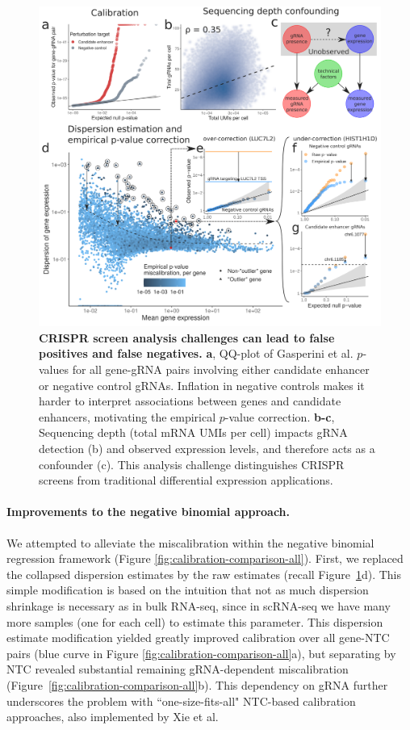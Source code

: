 \documentclass{nature}
\begin{document}
\addtocounter{page}{-1}
\thispagestyle{empty} 
\begin{figure}[h!]
	\includegraphics[width = \textwidth]{figures/Figure1/Figure1.png}
	\caption{\textbf{CRISPR screen analysis challenges can lead to false positives and false negatives.} \textbf{a}, QQ-plot of Gasperini et al. $p$-values for all gene-gRNA pairs involving either candidate enhancer or negative control gRNAs. Inflation in negative controls makes it harder to interpret associations between genes and candidate enhancers, motivating the empirical $p$-value correction. \textbf{b-c}, Sequencing depth (total mRNA UMIs per cell) impacts gRNA detection (b) and observed expression levels, and therefore acts as a confounder (c). This analysis challenge distinguishes CRISPR screens from traditional differential expression applications. }
	\label{fig:analysis-challenges}
\end{figure}

\clearpage

\paragraph{Improvements to the negative binomial approach.} 

We attempted to alleviate the miscalibration within the negative binomial regression framework (Figure \ref{fig:calibration-comparison-all}). First, we replaced the collapsed dispersion estimates by the raw estimates (recall Figure~\ref{fig:analysis-challenges}d). This simple modification is based on the intuition that not as much dispersion shrinkage is necessary as in bulk RNA-seq, since in scRNA-seq we have many more samples (one for each cell) to estimate this parameter. This dispersion estimate modification yielded greatly improved calibration over all gene-NTC pairs (blue curve in Figure \ref{fig:calibration-comparison-all}a), but separating by NTC revealed substantial remaining gRNA-dependent miscalibration (Figure~\ref{fig:calibration-comparison-all}b). 
This dependency on gRNA further underscores the problem with ``one-size-fits-all" NTC-based calibration approaches, also implemented by Xie et al.\cite{Xie2019}
\end{document}
